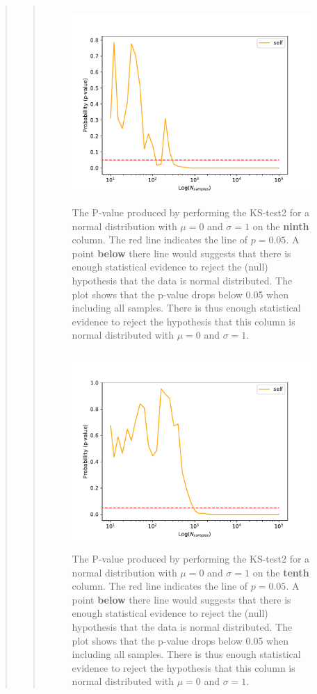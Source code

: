 \begin{quote}
\begin{quote}
\newpage

\begin{figure}[!ht]
\centering
\includegraphics[width=12cm, height=7.5cm]{./Plots/1e_plot_column_8.pdf}
\caption{The P-value produced by performing the KS-test2 for a normal distribution with $\mu = 0$ and $\sigma = 1$ on the \textbf{ninth} column.  The red line indicates the line of $ p = 0.05$. A point \textbf{below} there  line would suggests that there is enough statistical evidence to reject the (null) hypothesis that the data is normal distributed. The plot shows that the p-value drops below 0.05 when including all samples. There is thus enough statistical evidence to reject the hypothesis that this column is normal distributed with $\mu = 0$ and $\sigma = 1$.}
\end{figure}

\begin{figure}[!ht]
\centering
\includegraphics[width=12cm, height=7.5cm]{./Plots/1e_plot_column_9.pdf}
\caption{The P-value produced by performing the KS-test2 for a normal distribution with $\mu = 0$ and $\sigma = 1$ on the \textbf{tenth} column.  The red line indicates the line of $ p = 0.05$. A point \textbf{below} there  line would suggests that there is enough statistical evidence to reject the (null) hypothesis that the data is normal distributed. The plot shows that the p-value drops below 0.05 when including all samples. There is thus enough statistical evidence to reject the hypothesis that this column is normal distributed with $\mu = 0$ and $\sigma = 1$.}
\end{figure}
\end{quote}



\end{quote}

